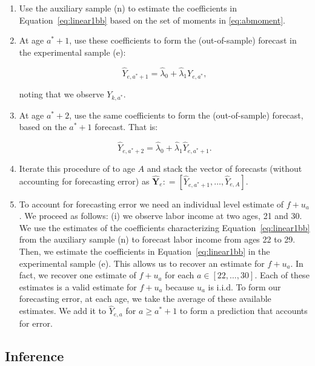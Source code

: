 \begin{enumerate}
\item Use the auxiliary sample (n) to estimate the coefficients in Equation~\eqref{eq:linear1bb} based on the set of moments in \eqref{eq:abmoment}.
\item At age $a^*+1$, use these coefficients to form the (out-of-sample) forecast in the experimental sample (e):

\begin{equation}
\hat{Y}_{e,a^* + 1} = \hat{\lambda}_{0} + \hat{\lambda}_{1} Y_{e,a^*},
\end{equation}

\noindent noting that we observe $Y_{k,a^*}$.

\item At age $a^*+2$, use the same coefficients to form the (out-of-sample) forecast, based on the $a^*+1$ forecast. That is:

\begin{equation}
\hat{Y}_{e,a^* + 2} = \hat{\lambda}_{0} + \hat{\lambda}_{1} \hat{Y}_{e,a^*+1}.
\end{equation}

\item Iterate this procedure of to age $A$ and stack the vector of forecasts (without accounting for forecasting error) as $\hat{\bm{Y}}_{e} : = \left[ \hat{Y}_{e,a^*+1}, \ldots,  \hat{Y}_{e,A} \right]$.

\item To account for forecasting error we need an individual level estimate of $f + u_{a}$. We proceed as follows: (i) we observe labor income at two ages, 21 and 30. We use the estimates of the coefficients characterizing Equation~\eqref{eq:linear1bb} from the auxiliary sample (n) to forecast labor income from ages 22 to 29. Then, we estimate the coefficients in Equation~\eqref{eq:linear1bb} in the experimental sample (e). This allows us to recover an estimate for $f + u_{a}$. In fact, we recover one estimate of $f + u_{a}$ for each $a \in \left[22, \ldots, 30 \right]$. Each of these estimates is a valid estimate for $f + u_{a}$ because $u_{a}$ is i.i.d. To form our forecasting error, at each age, we take the average of these available estimates. We add it to  $\hat{Y}_{e,a}$ for $a \geq a^* + 1$ to form a prediction that accounts for error.
\end{enumerate}


\subsection{Inference} \label{appendix:bootstrap}

